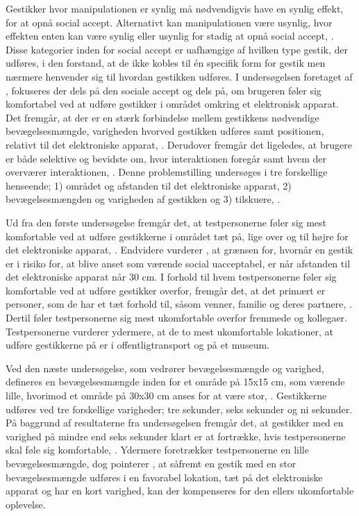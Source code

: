 Gestikker hvor manipulationen er synlig må nødvendigvis have en synlig effekt, for at opnå social accept. Alternativt kan manipulationen være usynlig, hvor effekten enten kan være synlig eller usynlig for stadig at opnå social accept, \parencite[s. 278]{PDF:WouldYouDoThat}. Disse kategorier inden for social accept er uafhængige af hvilken type gestik, der udføres, i den forstand, at de ikke kobles til én specifik form for gestik men nærmere henvender sig til hvordan gestikken udføres.\blankline
%
I undersøgelsen foretaget af \textcite[s. 193]{PDF:AreYouComfortableDoingThat}, fokuseres der dels på den sociale accept og dels på, om brugeren føler sig komfortabel ved at udføre gestikker i området omkring et elektronisk apparat. Det fremgår, at der er en stærk forbindelse mellem gestikkens nødvendige bevægelsesmængde, varigheden hvorved gestikken udføres samt positionen, relativt til det elektroniske apparat, \parencite[s. 193]{PDF:AreYouComfortableDoingThat}. Derudover fremgår det ligeledes, at brugere er både selektive og bevidste om, hvor interaktionen foregår samt hvem der overværer interaktionen, \parencite[s. 193]{PDF:AreYouComfortableDoingThat}. Denne problemstilling undersøges i tre forskellige henseende; 1) området og afstanden til det elektroniske apparat, 2) bevægelsesmængden og varigheden af gestikken og 3) tilskuere, \parencite[ss. 195-200]{PDF:AreYouComfortableDoingThat}. 

Ud fra den første undersøgelse fremgår det, at testpersonerne føler sig mest komfortable ved at udføre gestikkerne i området tæt på, lige over og til højre for det elektroniske apparat, \parencite[s. 197]{PDF:AreYouComfortableDoingThat}. Endvidere vurderer \textcite[s. 201]{PDF:AreYouComfortableDoingThat}, at grænsen for, hvornår en gestik er i risiko for, at blive anset som værende social uacceptabel, er når afstanden til det elektroniske apparat når 30 cm. I forhold til hvem testpersonerne føler sig komfortable ved at udføre gestikker overfor, fremgår det, at det primært er personer, som de har et tæt forhold til, såsom venner, familie og deres partnere, \parencite[s. 196]{PDF:AreYouComfortableDoingThat}. Dertil føler testpersonerne sig mest ukomfortable overfor fremmede og kollegaer. Testpersonerne vurderer ydermere, at de to mest ukomfortable lokationer, at udføre gestikkerne på er i offentligtransport og på et museum. 

Ved den næste undersøgelse, som vedrører bevægelsesmængde og varighed, defineres en bevægelsesmængde inden for et område på 15x15 cm, som værende lille, hvorimod et område på 30x30 cm anses for at være stor, \parencite[s. 198]{PDF:AreYouComfortableDoingThat}. Gestikkerne udføres ved tre forskellige varigheder; tre sekunder, seks sekunder og ni sekunder. På baggrund af resultaterne fra undersøgelsen fremgår det, at gestikker med en varighed på mindre end seks sekunder klart er at fortrække, hvis testpersonerne skal føle sig komfortable, \parencite[s. 199]{PDF:AreYouComfortableDoingThat}. Ydermere foretrækker testpersonerne en lille bevægelsesmængde, dog pointerer \textcite[s. 199]{PDF:AreYouComfortableDoingThat}, at såfremt en gestik med en stor bevægelsesmængde udføres i en favorabel lokation, tæt på det elektroniske apparat og har en kort varighed, kan der kompenseres for den ellers ukomfortable oplevelse. 

